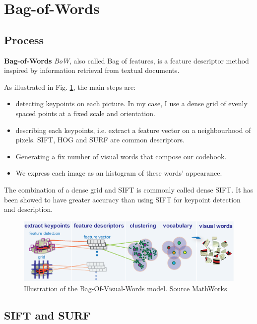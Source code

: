 \section{Bag-of-Words}
\subsection{Process}

\textbf{Bag-of-Words} \textit{BoW}, also called Bag of features, is a feature descriptor method inspired by information retrieval from textual documents.

As illustrated in Fig. \ref{fig:bow_process}, the main steps are:
\begin{itemize}
    \item detecting keypoints on each picture. In my case, I use a dense grid of evenly spaced points at a fixed scale and orientation.
    \item describing each keypoints, i.e. extract a feature vector on a neighbourhood of pixels. SIFT, HOG and SURF are common descriptors.
    \item Generating a fix number of visual words that compose our codebook.
    \item We express each image as an histogram of these words' appearance.
\end{itemize}

The combination of a dense grid and SIFT is commonly called dense SIFT. It has been showed to have greater accuracy than using SIFT for keypoint detection and description.

\begin{figure}
    \centering
    \includegraphics[scale=0.9]{img/bow.png}
    \caption[Illustration of the Bag-Of-Visual-Words model]{Illustration of the Bag-Of-Visual-Words model. Source \href{http://uk.mathworks.com/help/vision/ug/image-classification-with-bag-of-visual-words.html}{MathWorks}}
    \label{fig:bow_process}
\end{figure}

\subsection{SIFT and SURF}

